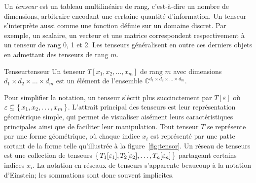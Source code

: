 Un \textit{tenseur} est un tableau multilinéaire de rang, c'est-à-dire un nombre de dimensions, arbitraire encodant une certaine quantité d'information. Un tenseur s'interprète aussi comme une fonction définie sur un domaine discret. Par exemple, un scalaire, un vecteur et une matrice correspondent respectivement à un tenseur de rang 0, 1 et 2. Les tenseurs généralisent en outre ces derniers objets en admettant des tenseurs de rang $m$. 

\begin{subdefinition}{Tenseur}{tenseur}
    Un tenseur $T[x_{1}, x_{2}, \dots, x_{m}]$ de rang $m$ avec dimensions $d_{1} \times d_{2} \times \dots \times d_{m}$ est un élément de l'ensemble $\mathbb{C}^{d_{1} \times d_{2} \times \dots \times d_{m}}$.
\end{subdefinition}

Pour simplifier la notation, un tenseur s'écrit plus succinctement par $T[\varepsilon]$ où $\varepsilon \subseteq \set{ x_{1}, x_{2}, \dots, x_{m} }$. L'attrait principal des tenseurs est leur représentation géométrique simple, qui permet de visualiser aisément leurs caractéristiques principales ainsi que de faciliter leur manipulation. Tout tenseur $T$ se représente par une forme géométrique, où chaque indice $x_{i}$ est représenté par une patte sortant de la forme telle qu'illustrée à la figure~\ref{fig:tensor}. Un réseau de tenseurs est une collection de tenseurs $\set{ T_{1}[\varepsilon_{1}], T_{2}[\varepsilon_{2}], \dots, T_{n}[\varepsilon_{n}] }$ partageant certains indices $x_{i}$. La notation en réseaux de tenseurs s'apparente beaucoup à la notation d'Einstein; les sommations sont donc souvent implicites. 

